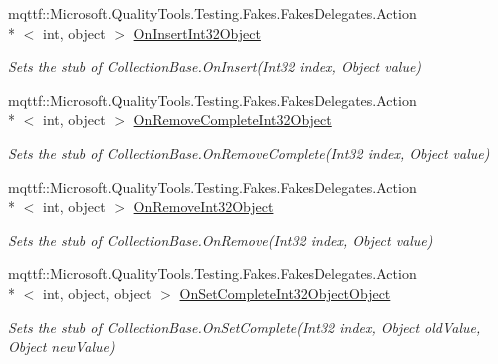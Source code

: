 \begin{DoxyCompactItemize}
mqttf\-::\-Microsoft.\-Quality\-Tools.\-Testing.\-Fakes.\-Fakes\-Delegates.\-Action\\*
$<$ int, object $>$ \hyperlink{class_system_1_1_security_1_1_cryptography_1_1_x509_certificates_1_1_fakes_1_1_stub_x509_certificate_collection_ae545c91dce886da719466e3869b41efc}{On\-Insert\-Int32\-Object}
\begin{DoxyCompactList}\small\item\em Sets the stub of Collection\-Base.\-On\-Insert(\-Int32 index, Object value)\end{DoxyCompactList}\item 
mqttf\-::\-Microsoft.\-Quality\-Tools.\-Testing.\-Fakes.\-Fakes\-Delegates.\-Action\\*
$<$ int, object $>$ \hyperlink{class_system_1_1_security_1_1_cryptography_1_1_x509_certificates_1_1_fakes_1_1_stub_x509_certificate_collection_aacd8a9c6bd50d15eec19cc3bfc9db063}{On\-Remove\-Complete\-Int32\-Object}
\begin{DoxyCompactList}\small\item\em Sets the stub of Collection\-Base.\-On\-Remove\-Complete(\-Int32 index, Object value)\end{DoxyCompactList}\item 
mqttf\-::\-Microsoft.\-Quality\-Tools.\-Testing.\-Fakes.\-Fakes\-Delegates.\-Action\\*
$<$ int, object $>$ \hyperlink{class_system_1_1_security_1_1_cryptography_1_1_x509_certificates_1_1_fakes_1_1_stub_x509_certificate_collection_a69d16bdd69eba5755e21f78875f2a245}{On\-Remove\-Int32\-Object}
\begin{DoxyCompactList}\small\item\em Sets the stub of Collection\-Base.\-On\-Remove(\-Int32 index, Object value)\end{DoxyCompactList}\item 
mqttf\-::\-Microsoft.\-Quality\-Tools.\-Testing.\-Fakes.\-Fakes\-Delegates.\-Action\\*
$<$ int, object, object $>$ \hyperlink{class_system_1_1_security_1_1_cryptography_1_1_x509_certificates_1_1_fakes_1_1_stub_x509_certificate_collection_a67b7efbed5efd30a343a2f2c3cb490d2}{On\-Set\-Complete\-Int32\-Object\-Object}
\begin{DoxyCompactList}\small\item\em Sets the stub of Collection\-Base.\-On\-Set\-Complete(\-Int32 index, Object old\-Value, Object new\-Value)\end{DoxyCompactList}\item 

\end{DoxyCompactItemize}
